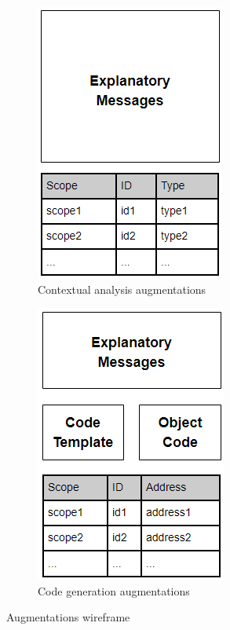 \documentclass{l4proj}
\begin{document}
\begin{figure}[h]
	\centering
	\begin{subfigure}[b]{.5\textwidth}
		\centering
		\includegraphics[width=.4\linewidth]{images/analytics-ca-wireframe.png}
		\caption{Contextual analysis augmentations}
		\label{fig:analytics-ca-wireframe}
	\end{subfigure}%
	\begin{subfigure}[b]{.5\textwidth}
		\centering
		\includegraphics[width=.4\linewidth]{images/analytics-cg-wireframe.png}
		\caption{Code generation augmentations}
		\label{fig:analytics-cg-wireframe}
	\end{subfigure}
	\caption{Augmentations wireframe}\label{fig:augmentations-wireframe}	
\end{figure}
\end{document}
